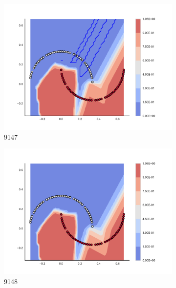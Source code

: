 \begin{figure}[h]
\begin{subfigure}[b]{0.09\textwidth}
    \includegraphics[clip, trim=2.35cm 1.75cm 4.5cm 0cm,width=\textwidth]{img/convergence/9147.pdf}
    \caption{9147}
    \label{fig:convergence_9147}
\end{subfigure}
%
\begin{subfigure}[b]{0.09\textwidth}
    \includegraphics[clip, trim=2.35cm 1.75cm 4.5cm 0cm,width=\textwidth]{img/convergence/9148.pdf}
    \caption{9148}
    \label{fig:convergence_9148}
\end{subfigure}
%
\begin{subfigure}[b]{0.09\textwidth}

\end{subfigure}
\end{figure}
